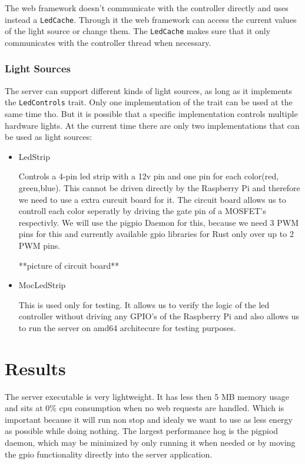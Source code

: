 \documentclass[conference]{IEEEtran}
\begin{document}
The web framework doesn't communicate with the controller directly and uses instead a \texttt{LedCache}. Through it the web 
framework can access the current values of the light source or change them. The \texttt{LedCache} makes sure that it only communicates
with the controller thread when necessary.


\subsubsection{Light Sources}
The server can support different kinds of light sources, as long as it implements the \texttt{LedControls} trait. Only one
implementation of the trait can be used at the same time tho. But it is possible that a specific implementation controls multiple
hardware lights. At the current time there are only two implementations that can be used as light sources:

\begin{itemize}
    \item LedStrip
    
    Controls a 4-pin led strip with a 12v pin and one pin for each color(red, green,blue). This cannot be driven directly by the
    Raspberry Pi and therefore we need to use a extra curcuit board\cite{rpiled} for it. The circuit board allows us to controll each
    color seperatly by driving the gate pin of a MOSFET's respectivly. We will use the pigpio Daemon\cite{pigpiod} for this, 
    because we need 3 PWM pins for this and currently available gpio libraries for Rust only over up to 2 PWM pins.
    
    **picture of circuit board**

    \item MocLedStrip
    
    This is used only for testing. It allows us to verify the logic of the led controller without driving any GPIO's of the
    Raspberry Pi and also allows us to run the server on amd64 architecure for testing purposes.
\end{itemize}



\section{Results}
The server executable is very lightweight. It has less then 5 MB memory usage and sits at 0\% cpu consumption when no web
requests are handled. Which is important because it will run non stop and idealy we want to use as less energy as possible while
doing nothing. The largest performance hog is the pigpiod daemon, which may be minimized by only running it when needed or by moving
the gpio functionality directly into the server application.
\end{document}
